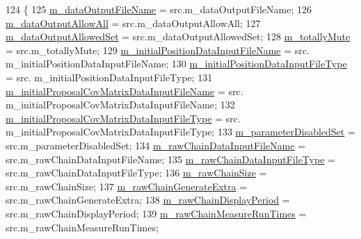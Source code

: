 \begin{DoxyCode}
124 \{
125   \hyperlink{class_q_u_e_s_o_1_1_mh_options_values_a768664ee23ad3783751eca33eaeb14b9}{m\_dataOutputFileName}                        = src.m\_dataOutputFileName;
126   \hyperlink{class_q_u_e_s_o_1_1_mh_options_values_a618cab38b10aab9a1c868a2d8672f374}{m\_dataOutputAllowAll}                        = src.m\_dataOutputAllowAll;
127   \hyperlink{class_q_u_e_s_o_1_1_mh_options_values_ac3c9acb7a09d53c2ae4bd9088e99aa27}{m\_dataOutputAllowedSet}                      = src.m\_dataOutputAllowedSet;
128   \hyperlink{class_q_u_e_s_o_1_1_mh_options_values_af812309e81191e88dfdc87c5815141a3}{m\_totallyMute}                               = src.m\_totallyMute;
129   \hyperlink{class_q_u_e_s_o_1_1_mh_options_values_a208c0eb1f88ee743b2710afb503c4b4d}{m\_initialPositionDataInputFileName}          = src.
      m\_initialPositionDataInputFileName;
130   \hyperlink{class_q_u_e_s_o_1_1_mh_options_values_ad5bdf1c0416c71aeef586e4c86b4d4be}{m\_initialPositionDataInputFileType}          = src.
      m\_initialPositionDataInputFileType;
131   \hyperlink{class_q_u_e_s_o_1_1_mh_options_values_af4cc4b8f1cea9441c9243d3ada49796b}{m\_initialProposalCovMatrixDataInputFileName} = src.
      m\_initialProposalCovMatrixDataInputFileName;
132   \hyperlink{class_q_u_e_s_o_1_1_mh_options_values_afd25d3ec572922fe1cf7ff39d431633e}{m\_initialProposalCovMatrixDataInputFileType} = src.
      m\_initialProposalCovMatrixDataInputFileType;
133   \hyperlink{class_q_u_e_s_o_1_1_mh_options_values_a88f45c280bb77a8a48d47504b8d9e898}{m\_parameterDisabledSet}                      = src.m\_parameterDisabledSet;
134   \hyperlink{class_q_u_e_s_o_1_1_mh_options_values_a3d031c2cdc8f17c589e999d11782c8ba}{m\_rawChainDataInputFileName}                 = src.m\_rawChainDataInputFileName;
135   \hyperlink{class_q_u_e_s_o_1_1_mh_options_values_a61974cb51a10d03dcd317dcd10f2684f}{m\_rawChainDataInputFileType}                 = src.m\_rawChainDataInputFileType;
136   \hyperlink{class_q_u_e_s_o_1_1_mh_options_values_a18dcb5898ba7101ae11856e866742aaf}{m\_rawChainSize}                              = src.m\_rawChainSize;
137   \hyperlink{class_q_u_e_s_o_1_1_mh_options_values_a9d540978290d39df801e32f183450859}{m\_rawChainGenerateExtra}                     = src.m\_rawChainGenerateExtra;
138   \hyperlink{class_q_u_e_s_o_1_1_mh_options_values_a6d11f0ea62107b789da99befe29ebffa}{m\_rawChainDisplayPeriod}                     = src.m\_rawChainDisplayPeriod;
139   \hyperlink{class_q_u_e_s_o_1_1_mh_options_values_a6fcc2efc9146b68548e62d707aeed883}{m\_rawChainMeasureRunTimes}                   = src.m\_rawChainMeasureRunTimes;

\end{DoxyCode}
